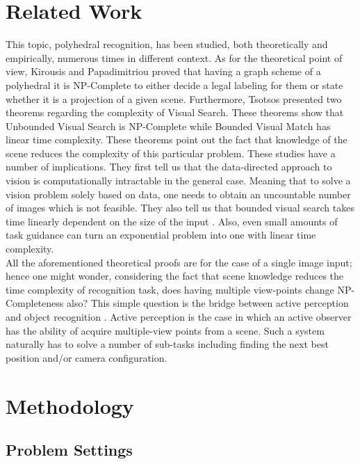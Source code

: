 \documentclass[crop=false]{standalone}
\begin{document}
\section{Related Work}

This topic, polyhedral recognition, has been studied, both theoretically and empirically, numerous times in different context. As for the theoretical point of view, Kirousis and Papadimitriou proved that having a graph scheme of a polyhedral it is NP-Complete to either decide a legal labeling for them or state whether it is a projection of a given scene\cite{10.1007/3-540-16766-8_17}. Furthermore, Tsotsos presented two theorems regarding the complexity of Visual Search. These theorems show that Unbounded Visual Search is NP-Complete while Bounded Visual Match has linear time complexity. These theorems point out the fact that knowledge of the scene reduces the complexity of this particular problem\cite{tsotsos1989complexity}. These studies have a number of implications. They first tell us that the data-directed approach to vision is computationally intractable in the general case. Meaning that to solve a vision problem solely based on data, one needs to obtain an uncountable number of images which is not feasible. They also tell us that bounded visual search takes time linearly dependent on the size of the input \cite{wolfe2015visual}. Also, even small amounts of task guidance can turn an exponential problem into one with linear time complexity.
\\

\noindent All the aforementioned theoretical proofs are for the case of a single image input; hence one might wonder, considering the fact that scene knowledge reduces the time complexity of recognition task, does having multiple view-points change NP-Completeness also? This simple question is the bridge between active perception and object recognition \cite{ffkf}. Active perception is the case in which an active observer has the ability of acquire multiple-view points from a scene. Such a system naturally has to solve a number of sub-tasks including finding the next best position and/or camera configuration.

\section{Methodology}
\subsection{Problem Settings}
\end{document}
